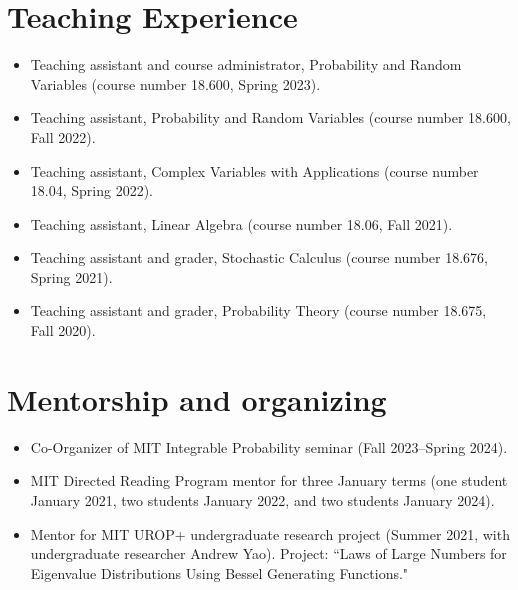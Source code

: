 \documentclass{cv_style}
\begin{document}
	\section{Teaching Experience}
		\begin{itemize}
		\item Teaching assistant and course administrator, Probability and Random Variables (course number 18.600, Spring 2023).
		\item Teaching assistant, Probability and Random Variables (course number 18.600, Fall 2022).
			\item Teaching assistant, Complex Variables with Applications (course number 18.04, Spring 2022).
			\item Teaching assistant, Linear Algebra (course number 18.06, Fall 2021).
			\item Teaching assistant and grader, Stochastic Calculus (course number 18.676, Spring 2021).
			\item Teaching assistant and grader, Probability Theory (course number 18.675, Fall 2020).
			
		\end{itemize}

\section{Mentorship and organizing}
\begin{itemize}

	\item Co-Organizer of MIT Integrable Probability seminar (Fall 2023--Spring 2024).


\item MIT Directed Reading Program mentor for three January terms (one student January 2021, two students January 2022, and two students January 2024). 

\item Mentor for MIT UROP+ undergraduate research project (Summer 2021, with undergraduate researcher Andrew Yao). Project: ``Laws of Large Numbers for Eigenvalue Distributions Using Bessel Generating Functions."








	
	\end{itemize}
\end{document}

